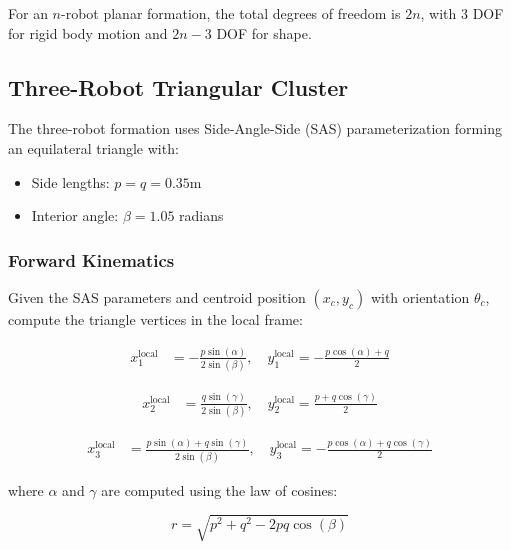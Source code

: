 \documentclass{article}
\begin{document}
For an $n$-robot planar formation, the total degrees of freedom is $2n$, with 3 DOF for rigid body motion and $2n-3$ DOF for shape.

\subsection{Three-Robot Triangular Cluster}

The three-robot formation uses Side-Angle-Side (SAS) parameterization forming an equilateral triangle with:
\begin{itemize}
\item Side lengths: $p = q = 0.35$m  
\item Interior angle: $\beta = 1.05$ radians
\end{itemize}

\subsubsection{Forward Kinematics}

Given the SAS parameters and centroid position $(x_c, y_c)$ with orientation $\theta_c$, compute the triangle vertices in the local frame:

\begin{equation}
\begin{aligned}
x_1^{\text{local}} &= -\frac{p \sin(\alpha)}{2 \sin(\beta)}, \quad
y_1^{\text{local}} = -\frac{p \cos(\alpha) + q}{2}
\end{aligned}
\end{equation}

\begin{equation}
\begin{aligned}
x_2^{\text{local}} &= \frac{q \sin(\gamma)}{2 \sin(\beta)}, \quad
y_2^{\text{local}} = \frac{p + q \cos(\gamma)}{2}
\end{aligned}
\end{equation}

\begin{equation}
\begin{aligned}
x_3^{\text{local}} &= \frac{p \sin(\alpha) + q \sin(\gamma)}{2 \sin(\beta)}, \quad
y_3^{\text{local}} = -\frac{p \cos(\alpha) + q \cos(\gamma)}{2}
\end{aligned}
\end{equation}

where $\alpha$ and $\gamma$ are computed using the law of cosines:

\begin{equation}
r = \sqrt{p^2 + q^2 - 2pq\cos(\beta)}
\end{equation}
\end{document}
